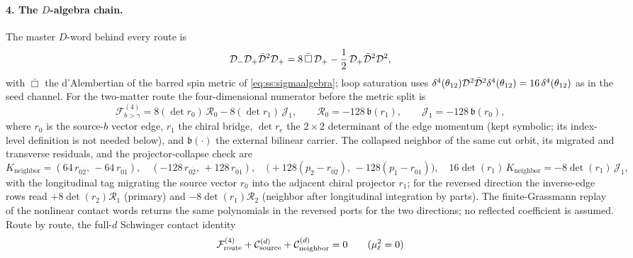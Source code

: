 \paragraph{4. The $D$-algebra chain.} The master $D$-word behind every route is
\begin{equation}\label{eq:bg:masterD}
\mathcal{D}_{-}\mathcal{D}_{+}\bar{\mathcal{D}}^{2}\mathcal{D}_{+} =8\,\bar\Box\,\mathcal{D}_{+}-\frac12\,\mathcal{D}_{+}\bar{\mathcal{D}}^{2}\mathcal{D}^{2} ,
\end{equation}
with $\bar\Box$ the d'Alembertian of the barred spin metric of \eqref{eq:ss:sigmaalgebra}; loop saturation uses
$\delta^{4}(\theta_{12})\mathcal{D}^{2}\bar{\mathcal{D}}^{2}\delta^{4}(\theta_{12})=16\,\delta^{4}(\theta_{12})$ as in the seed channel.
For the two-matter route the four-dimensional numerator before the metric split is
\begin{equation}\label{eq:bg:tmmnum}
\mathcal F^{(4)}_{b>\gamma} =8(\det r_{0})\,\mathcal R_{0}-8(\det r_{1})\,\mathcal J_{1}, \qquad \mathcal R_{0}=-128\,\mathfrak b(r_{1}), \qquad \mathcal J_{1}=-128\,\mathfrak b(r_{0}) ,
\end{equation}
where $r_{0}$ is the source-$b$ vector edge, $r_{1}$ the chiral bridge, $\det r_{e}$ the $2\times2$ determinant of
the edge momentum (kept symbolic; its index-level definition is not needed below), and $\mathfrak b(\cdot)$ the
external bilinear carrier. The collapsed neighbor of the same cut orbit, its migrated and transverse residuals, and
the projector-collapse check are
\begin{equation}\label{eq:bg:tmmcontact}
K_{\mathrm{neighbor}}=(64\,r_{0\dot2},\,-64\,r_{0\dot1}), \quad (-128\,r_{0\dot2},\,+128\,r_{0\dot1}), \quad \big(+128(p_{\dot2}-r_{0\dot2}),\,-128(p_{\dot1}-r_{0\dot1})\big), \quad 16\det(r_{1})\,K_{\mathrm{neighbor}}=-8\det(r_{1})\,\mathcal J_{1} ,
\end{equation}
with the longitudinal tag migrating the source vector $r_{0}$ into the adjacent chiral projector $r_{1}$; for the
reversed direction the inverse-edge rows read $+8\det(r_{2})\mathcal R_{1}$ (primary) and $-8\det(r_{1})\mathcal
R_{2}$ (neighbor after longitudinal integration by parts). The finite-Grassmann replay of the nonlinear contact
words returns the same polynomials in the reversed ports for the two directions; no reflected coefficient is
assumed. Route by route, the full-$d$ Schwinger contact identity
\begin{equation}\label{eq:bg:sdcontact}
\mathcal F^{(4)}_{\mathrm{route}} +\mathcal C^{(d)}_{\mathrm{source}} +\mathcal C^{(d)}_{\mathrm{neighbor}}=0 \qquad(\mu_\ell^{2}=0)
\end{equation}
